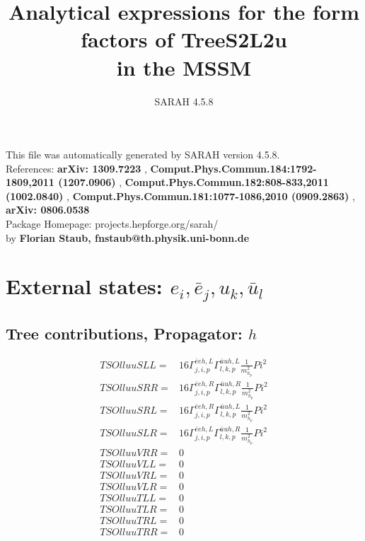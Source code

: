 \documentclass[A4,landscape]{article}
\begin{document}
\title{Analytical expressions for the form factors of TreeS2L2u\\ in the MSSM } 
 \author{SARAH 4.5.8} 
 \maketitle 
 \vspace{10cm} 
This file was automatically generated by SARAH version 4.5.8.  \\ 
References: {\bf arXiv: 1309.7223 }, {\bf Comput.Phys.Commun.184:1792-1809,2011 (1207.0906) }, {\bf Comput.Phys.Commun.182:808-833,2011 (1002.0840) }, {\bf Comput.Phys.Commun.181:1077-1086,2010 (0909.2863) }, {\bf arXiv: 0806.0538 } \\ 
Package Homepage: projects.hepforge.org/sarah/ \\ 
by {\bf Florian Staub, fnstaub@th.physik.uni-bonn.de} 
 \pagebreak 
 \tableofcontents 
 \pagebreak 
\section{External states: ${e_{{i}}, \bar{e}_{{j}}, u_{{k}}, \bar{u}_{{l}}}$} 
\subsection{Tree contributions, Propagator: $h$} 

\begin{align} 
  TSOlluuSLL= & 16 \Gamma^{\bar{e}e h ,L}_{j, i, p} \Gamma^{\bar{u}u h ,L}_{l, k, p} \frac{1}{m^2_{h_{{p}}}} Pi^2 \\ 
  TSOlluuSRR= & 16 \Gamma^{\bar{e}e h ,R}_{j, i, p} \Gamma^{\bar{u}u h ,R}_{l, k, p} \frac{1}{m^2_{h_{{p}}}} Pi^2 \\ 
  TSOlluuSRL= & 16 \Gamma^{\bar{e}e h ,R}_{j, i, p} \Gamma^{\bar{u}u h ,L}_{l, k, p} \frac{1}{m^2_{h_{{p}}}} Pi^2 \\ 
  TSOlluuSLR= & 16 \Gamma^{\bar{e}e h ,L}_{j, i, p} \Gamma^{\bar{u}u h ,R}_{l, k, p} \frac{1}{m^2_{h_{{p}}}} Pi^2 \\ 
  TSOlluuVRR= & 0 \\ 
  TSOlluuVLL= & 0 \\ 
  TSOlluuVRL= & 0 \\ 
  TSOlluuVLR= & 0 \\ 
  TSOlluuTLL= & 0 \\ 
  TSOlluuTLR= & 0 \\ 
  TSOlluuTRL= & 0 \\ 
  TSOlluuTRR= & 0 \\ 
\end{align} 
\end{document}
